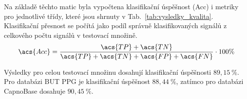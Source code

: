 Na základě těchto matic byla vypočtena klasifikační úspěšnost (\acs{Acc}) i metriky pro jednotlivé třídy, které jsou shrnuty v Tab.~\ref{tab:vysledky_kvalita}.
Klasifikační přesnost se počítá jako podíl správně klasifikovaných signálů z celkového počtu signálů v testovací množině.
\begin{equation}
	\label{eq:acc}
	\acs{Acc} = \frac{\acs{TP} + \acs{TN}}{\acs{TP} + \acs{TN} + \acs{FP} + \acs{FN}} \cdot 100\%
\end{equation}

Výsledky pro celou testovací množinu dosahují klasifikační úspěšnosti $89,15~\%$.
Pro databázi \acs{BUT PPG} je klasifikační úspěšnost $88,44~\%$, zatímco pro databázi CapnoBase dosahuje $90,45~\%$.